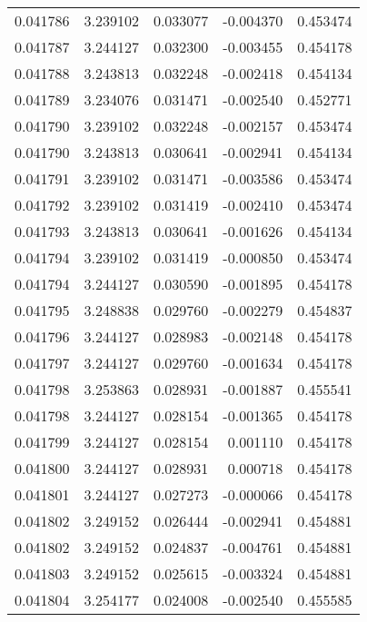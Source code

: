 \begin{tabular}{lrrrr}
0.041786    &  3.239102 &  0.033077 & -0.004370 &             0.453474 \\
0.041787    &  3.244127 &  0.032300 & -0.003455 &             0.454178 \\
0.041788    &  3.243813 &  0.032248 & -0.002418 &             0.454134 \\
0.041789    &  3.234076 &  0.031471 & -0.002540 &             0.452771 \\
0.041790    &  3.239102 &  0.032248 & -0.002157 &             0.453474 \\
0.041790    &  3.243813 &  0.030641 & -0.002941 &             0.454134 \\
0.041791    &  3.239102 &  0.031471 & -0.003586 &             0.453474 \\
0.041792    &  3.239102 &  0.031419 & -0.002410 &             0.453474 \\
0.041793    &  3.243813 &  0.030641 & -0.001626 &             0.454134 \\
0.041794    &  3.239102 &  0.031419 & -0.000850 &             0.453474 \\
0.041794    &  3.244127 &  0.030590 & -0.001895 &             0.454178 \\
0.041795    &  3.248838 &  0.029760 & -0.002279 &             0.454837 \\
0.041796    &  3.244127 &  0.028983 & -0.002148 &             0.454178 \\
0.041797    &  3.244127 &  0.029760 & -0.001634 &             0.454178 \\
0.041798    &  3.253863 &  0.028931 & -0.001887 &             0.455541 \\
0.041798    &  3.244127 &  0.028154 & -0.001365 &             0.454178 \\
0.041799    &  3.244127 &  0.028154 &  0.001110 &             0.454178 \\
0.041800    &  3.244127 &  0.028931 &  0.000718 &             0.454178 \\
0.041801    &  3.244127 &  0.027273 & -0.000066 &             0.454178 \\
0.041802    &  3.249152 &  0.026444 & -0.002941 &             0.454881 \\
0.041802    &  3.249152 &  0.024837 & -0.004761 &             0.454881 \\
0.041803    &  3.249152 &  0.025615 & -0.003324 &             0.454881 \\
0.041804    &  3.254177 &  0.024008 & -0.002540 &             0.455585 \\

\end{tabular}
